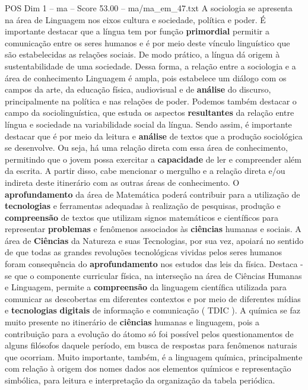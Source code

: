 \begin{textsample}{POS Dim 1 – ma – Score 53.00 – ma/ma\_em\_47.txt}
A sociologia se apresenta na área de Linguagem nos eixos cultura e sociedade, política e poder.
É importante destacar que a língua tem por função \textbf{primordial} permitir a comunicação entre os seres humanos e é por meio deste vínculo linguístico que são estabelecidas as relações sociais.
De modo prático, a língua dá origem à sustentabilidade de uma sociedade.
Dessa forma, a relação entre a sociologia e a área de conhecimento Linguagem é ampla, pois estabelece um diálogo com os campos da arte, da educação física, audiovisual e de \textbf{análise} do discurso, principalmente na política e nas relações de poder.
Podemos também destacar o campo da sociolinguística, que estuda os aspectos \textbf{resultantes} da relação entre língua e sociedade na variabilidade social da língua.
Sendo assim, é importante destacar que é por meio da leitura e \textbf{análise} de textos que a produção sociológica se desenvolve.
Ou seja, há uma relação direta com essa área de conhecimento, permitindo que o jovem possa exercitar a \textbf{capacidade} de ler e compreender além da escrita.
A partir disso, cabe mencionar o mergulho e a relação direta e/ou indireta deste itinerário com as outras áreas de conhecimento.
O \textbf{aprofundamento} da área de Matemática poderá contribuir para a utilização de \textbf{tecnologias} e ferramentas adequadas à realização de pesquisas, produção e \textbf{compreensão} de textos que utilizam signos matemáticos e científicos para representar \textbf{problemas} e fenômenos associados às \textbf{ciências} humanas e sociais.
A área de \textbf{Ciências} da Natureza e suas Tecnologias, por sua vez, apoiará no sentido de que todas as grandes revoluções tecnológicas vividas pelos seres humanos foram consequência do \textbf{aprofundamento} nos estudos das leis da física.
Destaca -se que o componente curricular física, na interseção na área de Ciências Humanas e Linguagem, permite a \textbf{compreensão} da linguagem científica utilizada para comunicar as descobertas em diferentes contextos e por meio de diferentes mídias e \textbf{tecnologias} \textbf{digitais} de informação e comunicação ( TDIC ).
A química se faz muito presente no itinerário de \textbf{ciências} humanas e linguagem, pois a contribuição para a evolução do átomo só foi possível pelos questionamentos de alguns filósofos daquele período, em busca de respostas para fenômenos naturais que ocorriam.
Muito importante, também, é a linguagem química, principalmente com relação à origem dos nomes dados aos elementos químicos e representação simbólica, para leitura e interpretação da organização da tabela periódica.

\end{textsample}
